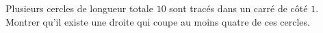 Plusieurs cercles de longueur totale $10$ sont tracés dans un carré de côté $1$. Montrer qu'il existe une droite qui coupe au moins quatre de ces cercles.
